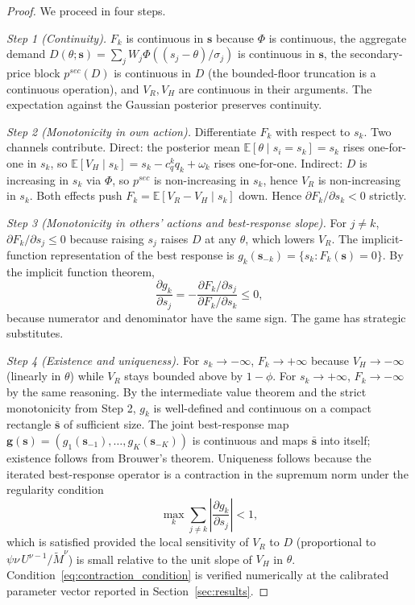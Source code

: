 \begin{proof}
We proceed in four steps.

\emph{Step 1 (Continuity).} $F_k$ is continuous in $\boldsymbol{s}$ because $\Phi$ is continuous, the aggregate demand $D(\theta; \boldsymbol{s}) = \sum_j W_j \Phi((s_j - \theta)/\sigma_j)$ is continuous in $\boldsymbol{s}$, the secondary-price block $p^{sec}(D)$ is continuous in $D$ (the bounded-floor truncation is a continuous operation), and $V_R, V_H$ are continuous in their arguments. The expectation against the Gaussian posterior preserves continuity.

\emph{Step 2 (Monotonicity in own action).} Differentiate $F_k$ with respect to $s_k$. Two channels contribute. Direct: the posterior mean $\mathbb{E}[\theta \mid s_i = s_k] = s_k$ rises one-for-one in $s_k$, so $\mathbb{E}[V_H \mid s_k] = s_k - c_q^k q_k + \omega_k$ rises one-for-one. Indirect: $D$ is increasing in $s_k$ via $\Phi$, so $p^{sec}$ is non-increasing in $s_k$, hence $V_R$ is non-increasing in $s_k$. Both effects push $F_k = \mathbb{E}[V_R - V_H \mid s_k]$ down. Hence $\partial F_k / \partial s_k < 0$ strictly.

\emph{Step 3 (Monotonicity in others' actions and best-response slope).} For $j \neq k$, $\partial F_k / \partial s_j \leq 0$ because raising $s_j$ raises $D$ at any $\theta$, which lowers $V_R$. The implicit-function representation of the best response is $g_k(\boldsymbol{s}_{-k}) = \{s_k : F_k(\boldsymbol{s}) = 0\}$. By the implicit function theorem,
\[
\frac{\partial g_k}{\partial s_j} = -\frac{\partial F_k / \partial s_j}{\partial F_k / \partial s_k} \leq 0,
\]
because numerator and denominator have the same sign. The game has strategic substitutes.

\emph{Step 4 (Existence and uniqueness).} For $s_k \to -\infty$, $F_k \to +\infty$ because $V_H \to -\infty$ (linearly in $\theta$) while $V_R$ stays bounded above by $1 - \phi$. For $s_k \to +\infty$, $F_k \to -\infty$ by the same reasoning. By the intermediate value theorem and the strict monotonicity from Step 2, $g_k$ is well-defined and continuous on a compact rectangle $\bar{\boldsymbol{s}}$ of sufficient size. The joint best-response map $\boldsymbol{g}(\boldsymbol{s}) = (g_1(\boldsymbol{s}_{-1}), \dots, g_K(\boldsymbol{s}_{-K}))$ is continuous and maps $\bar{\boldsymbol{s}}$ into itself; existence follows from Brouwer's theorem. Uniqueness follows because the iterated best-response operator is a contraction in the supremum norm under the regularity condition
\begin{equation}\label{eq:contraction_condition}
\max_k \sum_{j \neq k} \left| \frac{\partial g_k}{\partial s_j} \right| < 1,
\end{equation}
which is satisfied provided the local sensitivity of $V_R$ to $D$ (proportional to $\psi \nu \, U^{\nu-1}/\widetilde{M}^\nu$) is small relative to the unit slope of $V_H$ in $\theta$. Condition~\eqref{eq:contraction_condition} is verified numerically at the calibrated parameter vector reported in Section~\ref{sec:results}.
\end{proof}


